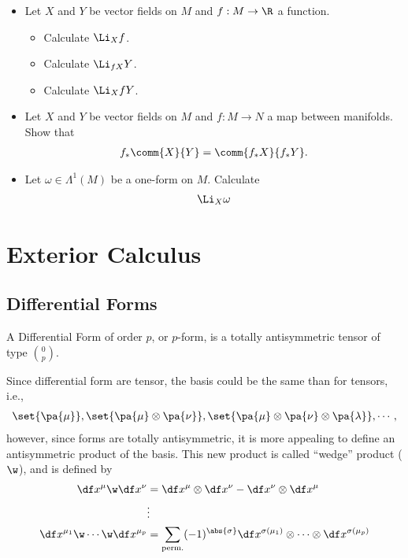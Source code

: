 \begin{Ebox}
  \begin{itemize}
  \item Let $X$ and $Y$ be vector fields on $M$ and $f:M\to\R$ a function.
    \begin{itemize}
    \item Calculate $\Li_{X}f$.
    \item Calculate $\Li_{fX}Y$.
    \item Calculate $\Li_{X}fY$.
    \end{itemize}
  \item  Let $X$ and $Y$ be vector fields on $M$ and $f:M\to N$ a map between manifolds. Show that
    \begin{align}
      f_*\comm{X}{Y} =\comm{f_*X}{f_*Y}.
    \end{align}
  \item Let $\omega\in\Lambda^1(M)$ be a one-form on $M$. Calculate
    \begin{align}
      \Li_X \omega
    \end{align}
  \end{itemize}
\end{Ebox}




\chapter{Exterior Calculus}

\section{Differential Forms}

\begin{Def}
  A {\sc Differential Form} of order $p$, or $p$-form, is a totally antisymmetric tensor of type $\binom{0}{p}$.
\end{Def}

Since differential form are tensor, the basis could be the same than for tensors, i.e.,
\begin{align*}
  \set{\pa{\mu}},\set{\pa{\mu}\otimes\pa{\nu}},\set{\pa{\mu}\otimes\pa{\nu}\otimes\pa{\lambda}},\cdots,
\end{align*}
however, since forms are totally antisymmetric, it is more appealing to define an antisymmetric product of the basis. This new product is called ``wedge'' product ($\w$), and is defined by
\begin{align}
  \df x^\mu\w\df x^\nu &= \df x^\mu\otimes\df x^\nu-\df x^\nu\otimes \df x^\mu\\
 &\vdots\\
  \df x^{\mu_1}\w\cdots\w\df x^{\mu_p}&= \sum_{\text{perm.}}(-1)^{\abs{\sigma}}\df x^{\sigma(\mu_1)}\otimes\cdots\otimes\df x^{\sigma(\mu_p)}
\end{align}

